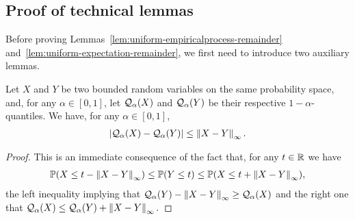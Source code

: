 \subsection{Proof of technical lemmas}
\label{sec:technical-lemmas}
Before proving Lemmas~\ref{lem:uniform-empiricalprocess-remainder} and~\ref{lem:uniform-expectation-remainder}, we first need to introduce two auxiliary lemmas. 
\begin{lemma}
\label{lem:quantile-infty-norm}
Let $X$ and $Y$ be two bounded random variables on the same probability space, and, for any $\alpha \in [0,1]$, let $\mathcal{Q}_{\alpha}(X)$ and $\mathcal{Q}_{\alpha}(Y)$ be their respective $1-\alpha$-quantiles.  We have, for any $\alpha \in [0,1]$,
\begin{align*}
\left| \mathcal{Q}_{\alpha}(X) - \mathcal{Q}_{\alpha}(Y)\right| \le \left\|{X-Y}\right\|_\infty.
\end{align*}
\end{lemma}
\begin{proof}
This is an immediate consequence of the fact that, for any $t \in \mathbb{R}$ we have
\begin{align*}
\mathbb{P}( X \le t - \left\|{X-Y}\right\|_\infty ) \le \mathbb{P}(Y \le t) \le \mathbb{P}(X \le t + \left\|{X-Y}\right\|_\infty),
\end{align*}
the left inequality implying that
$
\mathcal{Q}_\alpha(Y) - \left\|{X-Y}\right\|_\infty \ge \mathcal{Q}_\alpha(X) 
$
and the right one that
$
\mathcal{Q}_\alpha(X) \le \mathcal{Q}_\alpha(Y) + \left\|{X-Y}\right\|_\infty.
$
\end{proof}

